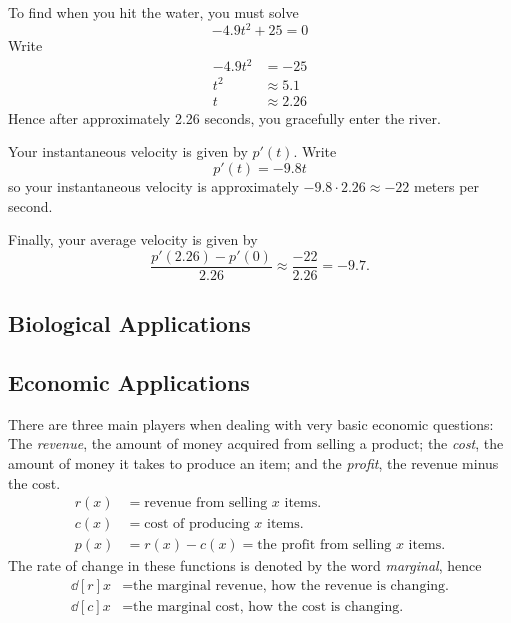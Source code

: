 \begin{solution}
To find when you hit the water, you must solve
\[
-4.9t^2 + 25 = 0
\]
Write
\begin{align*}
-4.9t^2 &= -25 \\
t^2 &\approx 5.1 \\ 
t &\approx 2.26
\end{align*}
Hence after approximately 2.26 seconds, you gracefully enter the
river.

Your instantaneous velocity is given by $p'(t)$. Write
\[
p'(t) = -9.8t
\]
so your instantaneous velocity is approximately $-9.8\cdot 2.26\approx
-22$ meters per second.

Finally, your average velocity is given by
\[
\frac{p'(2.26) -p'(0)}{2.26} \approx \frac{-22}{2.26} = -9.7.
\]
\end{solution}

\subsection*{Biological Applications}



\subsection*{Economic Applications}

There are three main players when dealing with very basic economic
questions: The \textit{revenue}, the amount of money acquired from
selling a product; the \textit{cost}, the amount of money it takes to
produce an item; and the \textit{profit}, the revenue minus the cost.
\begin{align*}
r(x) &= \text{revenue from selling $x$ items.}\\
c(x) &= \text{cost of producing $x$ items.}\\
p(x) &= r(x)-c(x) = \text{the profit from selling $x$ items}.
\end{align*}
The rate of change in these functions is denoted by the word \textit{marginal}, hence 
\begin{align*}
\dd[r]{x} &= \text{the marginal revenue, how the revenue is changing.}\\
\dd[c]{x} &= \text{the marginal cost, how the cost is changing.}
\end{align*}

